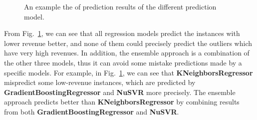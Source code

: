 \documentclass[10pt, oneside]{article}   	%
\newcommand\figref{Fig.~\ref}
\begin{document}
\begin{figure}[h]
\centering
{}
\caption{
An example the of prediction results of the different prediction model.}
\label{fig:predict_results}
\end{figure}

From \figref{fig:predict_results}, we can see that all regression models predict the instances with lower revenue better, and none of them could precisely predict the outliers which have very high revenues. 
In addition, the ensemble approach is a combination of the other three models, thus it can avoid some mistake predictions made by a specific models.
For example, in \figref{fig:predict_results}, we can see that \textbf{KNeighborsRegressor} mispredict some low-revenue instances, which are predicted by \textbf{GradientBoostingRegressor} and \textbf{NuSVR} more precisely. 
The ensemble approach predicts better than  \textbf{KNeighborsRegressor} by combining results from both \textbf{GradientBoostingRegressor} and \textbf{NuSVR}.
\end{document}
